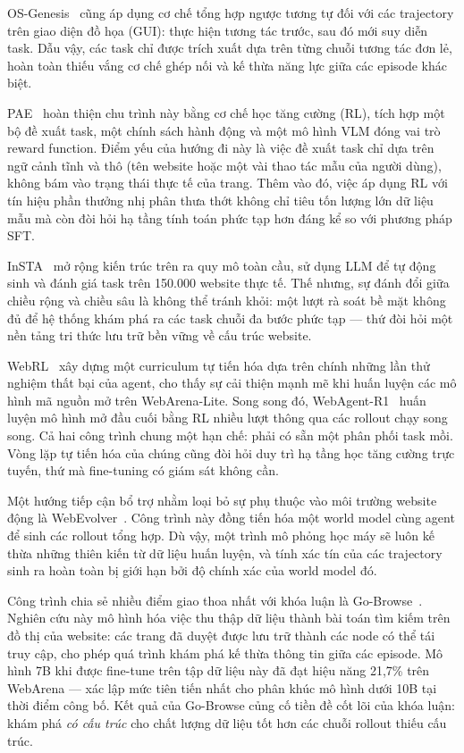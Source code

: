 OS-Genesis~\cite{sun2024osgenesis} cũng áp dụng cơ chế tổng hợp ngược tương tự đối với các trajectory trên giao diện đồ họa (GUI): thực hiện tương tác trước, sau đó mới suy diễn task. Dẫu vậy, các task chỉ được trích xuất dựa trên từng chuỗi tương tác đơn lẻ, hoàn toàn thiếu vắng cơ chế ghép nối và kế thừa năng lực giữa các episode khác biệt.

PAE~\cite{zhou2024pae} hoàn thiện chu trình này bằng cơ chế học tăng cường (RL), tích hợp một bộ đề xuất task, một chính sách hành động và một mô hình VLM đóng vai trò reward function. Điểm yếu của hướng đi này là việc đề xuất task chỉ dựa trên ngữ cảnh tĩnh và thô (tên website hoặc một vài thao tác mẫu của người dùng), không bám vào trạng thái thực tế của trang. Thêm vào đó, việc áp dụng RL với tín hiệu phần thưởng nhị phân thưa thớt không chỉ tiêu tốn lượng lớn dữ liệu mẫu mà còn đòi hỏi hạ tầng tính toán phức tạp hơn đáng kể so với phương pháp SFT.

InSTA~\cite{trabucco2025insta} mở rộng kiến trúc trên ra quy mô toàn cầu, sử dụng LLM để tự động sinh và đánh giá task trên 150.000 website thực tế. Thế nhưng, sự đánh đổi giữa chiều rộng và chiều sâu là không thể tránh khỏi: một lượt rà soát bề mặt không đủ để hệ thống khám phá ra các task chuỗi đa bước phức tạp --- thứ đòi hỏi một nền tảng tri thức lưu trữ bền vững về cấu trúc website.

WebRL~\cite{qi2025webrl} xây dựng một curriculum tự tiến hóa dựa trên chính những lần thử nghiệm thất bại của agent, cho thấy sự cải thiện mạnh mẽ khi huấn luyện các mô hình mã nguồn mở trên WebArena-Lite. Song song đó, WebAgent-R1~\cite{wei2025webagentr1} huấn luyện mô hình mở đầu cuối bằng RL nhiều lượt thông qua các rollout chạy song song. Cả hai công trình chung một hạn chế: phải có sẵn một phân phối task mồi. Vòng lặp tự tiến hóa của chúng cũng đòi hỏi duy trì hạ tầng học tăng cường trực tuyến, thứ mà fine-tuning có giám sát không cần.

Một hướng tiếp cận bổ trợ nhằm loại bỏ sự phụ thuộc vào môi trường website động là WebEvolver~\cite{fang2025webevolver}. Công trình này đồng tiến hóa một world model cùng agent để sinh các rollout tổng hợp. Dù vậy, một trình mô phỏng học máy sẽ luôn kế thừa những thiên kiến từ dữ liệu huấn luyện, và tính xác tín của các trajectory sinh ra hoàn toàn bị giới hạn bởi độ chính xác của world model đó.

Công trình chia sẻ nhiều điểm giao thoa nhất với khóa luận là Go-Browse~\cite{gandhi2026gobrowse}. Nghiên cứu này mô hình hóa việc thu thập dữ liệu thành bài toán tìm kiếm trên đồ thị của website: các trang đã duyệt được lưu trữ thành các node có thể tái truy cập, cho phép quá trình khám phá kế thừa thông tin giữa các episode. Mô hình 7B khi được fine-tune trên tập dữ liệu này đã đạt hiệu năng 21{,}7\% trên WebArena --- xác lập mức tiên tiến nhất cho phân khúc mô hình dưới 10B tại thời điểm công bố. Kết quả của Go-Browse củng cố tiền đề cốt lõi của khóa luận: khám phá \emph{có cấu
trúc} cho chất lượng dữ liệu tốt hơn các chuỗi rollout thiếu cấu trúc.

